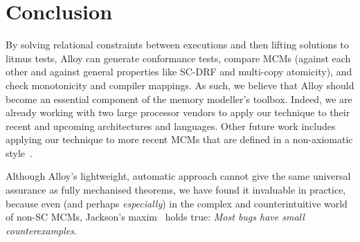 \section{Conclusion}
\label{sec:conc}

By solving relational constraints between executions and then lifting
solutions to litmus tests, Alloy can generate conformance tests,
compare MCMs (against each other and against general properties like
SC-DRF and multi-copy atomicity), and check monotonicity and compiler
mappings. As such, we believe that Alloy should become an essential
component of the memory modeller's toolbox. Indeed, we are already
working with two large processor vendors to apply our technique to
their recent and upcoming architectures and languages. Other future
work includes applying our technique to more recent MCMs that
are defined in a non-axiomatic style~\cite{jeffrey+16,
pichon-pharabod+16, flur+16, kang+17}.

Although Alloy's lightweight, automatic approach cannot give the same
universal assurance as fully mechanised theorems, we have found it
invaluable in practice, because even (and perhaps \emph{especially})
in the complex and counterintuitive world of non-SC MCMs, Jackson's
maxim~\cite{jackson12a} holds true: \emph{Most bugs have small
counterexamples}.
